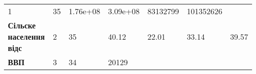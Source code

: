\documentclass[
]{article}
\begin{document}
\begin{longtable}[]{@{}lllllll@{}}
\begin{minipage}[t]{0.08\columnwidth}
1\strut
\end{minipage} & \begin{minipage}[t]{0.06\columnwidth}\raggedright
35\strut
\end{minipage} & \begin{minipage}[t]{0.12\columnwidth}\raggedright
1.76e+08\strut
\end{minipage} & \begin{minipage}[t]{0.12\columnwidth}\raggedright
3.09e+08\strut
\end{minipage} & \begin{minipage}[t]{0.12\columnwidth}\raggedright
83132799\strut
\end{minipage} & \begin{minipage}[t]{0.13\columnwidth}\raggedright
101352626\strut
\end{minipage}\tabularnewline
\begin{minipage}[t]{0.18\columnwidth}\raggedright
\textbf{Сільске населення відс}\strut
\end{minipage} & \begin{minipage}[t]{0.08\columnwidth}\raggedright
2\strut
\end{minipage} & \begin{minipage}[t]{0.06\columnwidth}\raggedright
35\strut
\end{minipage} & \begin{minipage}[t]{0.12\columnwidth}\raggedright
40.12\strut
\end{minipage} & \begin{minipage}[t]{0.12\columnwidth}\raggedright
22.01\strut
\end{minipage} & \begin{minipage}[t]{0.12\columnwidth}\raggedright
33.14\strut
\end{minipage} & \begin{minipage}[t]{0.13\columnwidth}\raggedright
39.57\strut
\end{minipage}\tabularnewline
\begin{minipage}[t]{0.18\columnwidth}\raggedright
\textbf{ВВП}\strut
\end{minipage} & \begin{minipage}[t]{0.08\columnwidth}\raggedright
3\strut
\end{minipage} & \begin{minipage}[t]{0.06\columnwidth}\raggedright
34\strut
\end{minipage} & \begin{minipage}[t]{0.12\columnwidth}\raggedright
20129\strut

\end{minipage}
\end{longtable}
\end{document}
